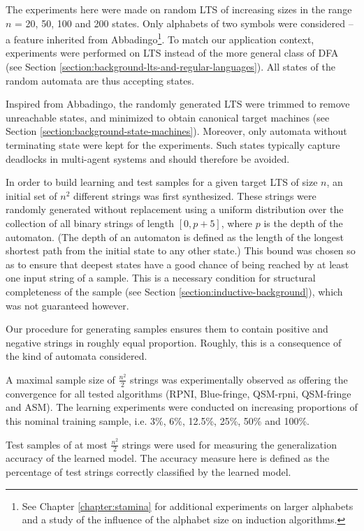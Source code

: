 The experiments here were made on random LTS of increasing sizes in the range $n$ = 20, 50, 100 and 200 states. Only alphabets of two symbols were considered -- a feature inherited from Abbadingo\footnote{See Chapter \ref{chapter:stamina} for additional experiments on larger alphabets and a study of the influence of the alphabet size on induction algorithms.}. To match our application context, experiments were performed on LTS instead of the more general class of DFA (see Section \ref{section:background-lts-and-regular-languages}). All states of the random automata are thus accepting states.

Inspired from Abbadingo, the randomly generated LTS were trimmed to remove unreachable states, and minimized to obtain canonical target machines (see Section \ref{section:background-state-machines}). Moreover, only automata without terminating state were kept for the experiments. Such states typically capture deadlocks in multi-agent systems and should therefore be avoided.

In order to build learning and test samples for a given target LTS of size $n$, an initial set of $n^2$ different strings was first synthesized. These strings were randomly generated without replacement using a uniform distribution over the collection of all binary strings of length $[0, p+5]$, where $p$ is the depth of the automaton. (The depth of an automaton is defined as the length of the longest shortest path from the initial state to any other state.) This bound was chosen so as to ensure that deepest states have a good chance of being reached by at least one input string of a sample. This is a necessary condition for structural completeness of the sample (see Section \ref{section:inductive-background}), which was not guaranteed however.

Our procedure for generating samples ensures them to contain positive and negative strings in roughly equal proportion. Roughly, this is a consequence of the kind of automata considered.
 
A maximal sample size of $\frac{n^2}{2}$ strings was experimentally observed as offering the convergence for all tested algorithms (RPNI, Blue-fringe, QSM-rpni, QSM-fringe and ASM). The learning experiments were conducted on increasing proportions of this nominal training sample, i.e. 3\%, 6\%, 12.5\%, 25\%, 50\% and 100\%.

Test samples of at most $\frac{n^2}{2}$ strings were used for measuring the generalization accuracy of the learned model. The accuracy measure here is defined as the percentage of test strings correctly classified by the learned model.


